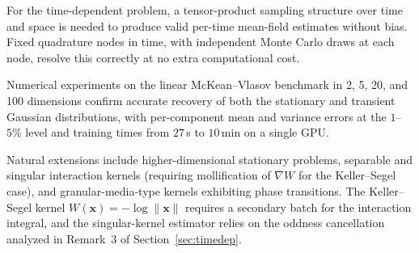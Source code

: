 \documentclass[12pt]{article}
\newcommand{\bx}{\mathbf{x}}
\theoremstyle{plain}
\begin{document}
For the time-dependent problem, a tensor-product sampling structure over time and space
is needed to produce valid per-time mean-field estimates without bias. Fixed quadrature
nodes in time, with independent Monte Carlo draws at each node, resolve this correctly at
no extra computational cost.

Numerical experiments on the linear McKean--Vlasov benchmark in 2, 5, 20, and 100
dimensions confirm accurate recovery of both the stationary and transient Gaussian
distributions, with per-component mean and variance errors at the $1$--$5\%$ level and
training times from $27\,$s to $10\,$min on a single GPU.

Natural extensions include higher-dimensional stationary problems, separable and singular
interaction kernels (requiring mollification of $\nabla W$ for the Keller--Segel case),
and granular-media-type kernels exhibiting phase transitions. The Keller--Segel kernel
$W(\bx)=-\log\|\bx\|$ requires a secondary batch for the interaction integral, and the
singular-kernel estimator relies on the oddness cancellation analyzed in
Remark~3 of Section~\ref{sec:timedep}.
\end{document}
